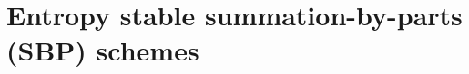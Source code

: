 \documentclass[compress]{beamer}
\theoremstyle{plain}
\newcommand{\td}[2]{\frac{{\rm d}#1}{{\rm d}{\rm #2}}}
\newcommand{\pd}[2]{\frac{\partial#1}{\partial#2}}
\newcommand{\LRp}[1]{\left( #1 \right)}
\renewcommand{\note}[1]{\textcolor{red}{{#1}}}
\begin{document}
\section{Entropy stable summation-by-parts (SBP) schemes}


%
%
%
%
\end{document}
